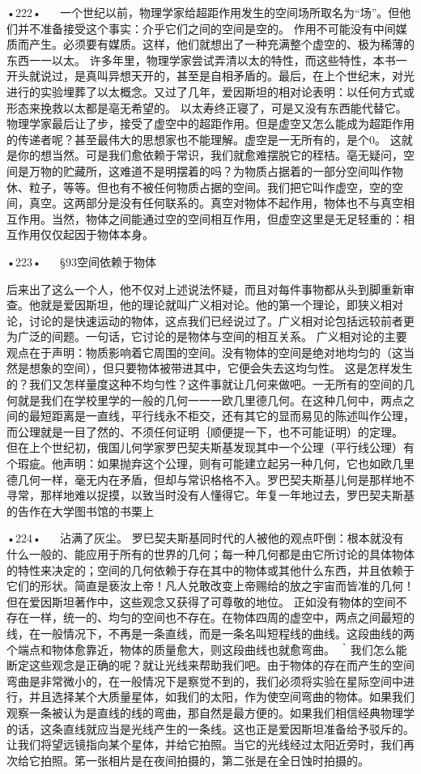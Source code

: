 •222•
  
一个世纪以前，物理学家给超距作用发生的空间场所取名为“场”。但他们并不准备接受这个事实：介乎它们之间的空间是空的。
作用不可能没有中间媒质而产生。必须要有媒质。这样，他们就想出了一种充满整个虚空的、极为稀薄的东西一一以太。
许多年里，物理学家尝试弄清以太的特性，而这些特性，本书一开头就说过，是真叫异想天开的，甚至是自相矛盾的。最后，在上个世纪末，对光进行的实验埋葬了以太概念。又过了几年，爱因斯坦的相对论表明：以任何方式或形态来挽救以太都是亳无希望的。
以太寿终正寝了，可是又没有东西能代替它。物理学家最后让了步，接受了虚空中的超距作用。但是虚空又怎么能成为超距作用的传递者呢？甚至最伟大的思想家也不能理解。虚空是一无所有的，是个0。
这就是你的想当然。可是我们愈依赖于常识，我们就愈难摆脱它的秷桔。亳无疑问，空间是万物的贮藏所，这难道不是明摆着的吗？为物质占据着的一部分空间叫作物休、粒子，等等。但也有不被任何物质占据的空间。我们把它叫作虚空，空的空间，真空。这两部分是没有任何联系的。真空对物体不起作用，物体也不与真空相互作用。当然，物体之间能通过空的空间相互作用，但虚空这里是无足轻重的：相互作用仅仅起因于物体本身。

•223•
  
§93空间依赖于物体

后来出了这么一个人，他不仅对上述说法怀疑，而且对每件事物都从头到脚重新审查。他就是爱因斯坦，他的理论就叫广义相对论。他的第一个理论，即狭义相对论，讨论的是快速运动的物体，这点我们已经说过了。广义相对论包括远较前者更为广泛的间题。一句话，它讨论的是物体与空间的相互关系。
广义相对论的主要观点在于声明：物质影响着它周围的空间。没有物体的空间是绝对地均匀的（这当然是想象的空间），但只要物体被带进其中，它便会失去这均匀性。
这是怎样发生的？我们又怎样量度这种不均匀性？这件事就让几何来做吧。一无所有的空间的几何就是我们在学校里学的一般的几何一一一欧几里德几何。在这种几何中，两点之间的最短距离是一直线，平行线永不柜交，还有其它的显而易见的陈述叫作公理，而公理就是一目了然的、不须任何证明｛顺便提一下，也不可能证明）的定理。
但在上个世纪初，俄国儿何学家罗巴契夫斯基发现其中一个公理（平行线公理）有个瑕疵。他声明：如果抛弃这个公理，则有可能建立起另一种几何，它也如欧几里德几何一样，毫无内在矛盾，但却与常识格格不入。罗巴契夫斯基儿何是那样地不寻常，那样地难以捉摸，以致当时没有人懂得它。年复一年地过去，罗巴契夫斯基的告作在大学图书馆的书栗上

•224•
  
沾满了灰尘。
罗巳契夫斯基同时代的人被他的观点吓倒：根本就没有什么一般的、能应用于所有的世界的几何；每一种几何都是由它所讨论的具体物体的特性来决定的；空间的几何依赖于存在其中的物体或其他什么东西，并且依赖于它们的形状。简直是亵汝上帝！凡人兑敢改变上帝赐给的放之宇宙而皆准的几何！
但在爱因斯坦著作中，这些观念又获得了可尊敬的地位。
正如没有物体的空间不存在一样，统一的、均匀的空间也不存在。在物体四周的虚空中，两点之间最短的线，在一般情况下，不再是一条直线，而是一条名叫短程线的曲线。这段曲线的两个端点和物体愈靠近，物体的质量愈大，则这段曲线也就愈弯曲。
｀我们怎么能断定这些观念是正确的呢？就让光线来帮助我们吧。由于物体的存在而产生的空间弯曲是非常微小的，在一般情况下是察觉不到的，我们必须将实验在星际空间中进行，并且选择某个大质量星体，如我们的太阳，作为使空间弯曲的物体。如果我们观察一条被认为是直线的线的弯曲，那自然是最方便的。如果我们相信经典物理学的话，这条直线就应当是光线产生的一条线。这也正是爱因斯坦准备给予驳斥的。
让我们将望远镜指向某个星体，并给它拍照。当它的光线经过太阳近旁时，我们再次给它拍照。笫一张相片是在夜间拍摄的，第二张是在全日蚀时拍摄的。

